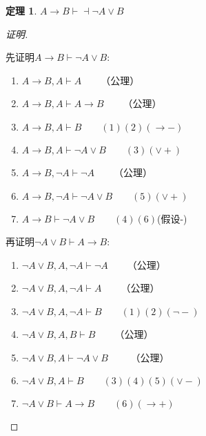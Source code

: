 \documentclass{article}
\newtheorem{Thm}{定理}
\begin{document}
\begin{CJK*}{UTF8}{gbsn}
  \begin{Thm}$A\to B\vdash \dashv \lnot A\lor B$\end{Thm}
  \begin{proof}[证明]$\quad$

    先证明$A\to B\vdash\lnot A\lor B$:
    \begin{enumerate}
      \item $ A\to B, A\vdash A\qquad $（公理） 
      \item $ A\to B, A\vdash A\to B\qquad $（公理）
      \item $ A\to B, A\vdash B\qquad (1)(2)(\to -)$
      \item $ A\to B, A\vdash \lnot A\lor B\qquad(3)(\lor +)$
      \item $ A\to B, \lnot A\vdash \lnot A\qquad$（公理）
      \item $ A\to B, \lnot A\vdash \lnot A\lor B\qquad(5)(\lor +)$
      \item $ A\to B\vdash\lnot A\lor B\qquad(4)(6)$(假设-) 
    \end{enumerate}
    再证明$\lnot A\lor B\vdash A\to B$: 
    \begin{enumerate}
      \item $ \lnot A\lor B, A,\lnot A\vdash \lnot A\qquad $（公理）
      \item $ \lnot A\lor B, A,\lnot A\vdash A\qquad $（公理）
      \item $ \lnot A\lor B, A,\lnot A\vdash B\qquad (1)(2)(\lnot -)$
      \item $ \lnot A\lor B, A,B\vdash B\qquad$（公理）
      \item $ \lnot A\lor B, A\vdash \lnot A\lor B\qquad$ （公理）
      \item $ \lnot A\lor B, A\vdash B\qquad(3)(4)(5)(\lor -)$
      \item $ \lnot A\lor B\vdash A\to B\qquad(6)(\to +)$
    \end{enumerate}
  \end{proof}


\end{CJK*}
\end{document}

